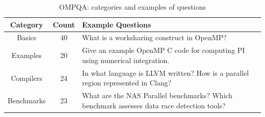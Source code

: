 \begin{table}[h]
\centering
\begin{tabular}{|c|c|p{3.7in}|}
\hline
 \textbf{Category}&  \textbf{Count} & \textbf{Example Questions}    \\
\hline
 Basics & 40 &  What is a worksharing construct in OpenMP? \\
\hline
Examples & 20 & Give an example OpenMP C code for computing PI using numerical integration. \\
\hline
Compilers & 24 &  {In what language is LLVM written? \newline How is a parallel region represented in Clang?} \\
\hline
 Benchmarks & 23 & {What are the NAS Parallel benchmarks? \newline Which benchmark assesses data race detection tools?}  \\
\hline 
\end{tabular}
\caption{OMPQA: categories and examples of questions}
\label{tab-omp-qa}
\end{table}

